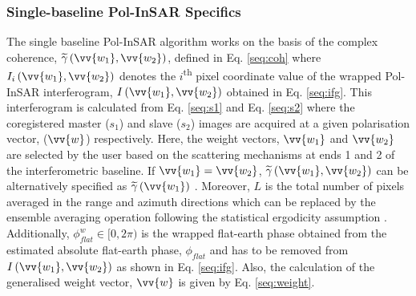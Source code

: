 \documentclass[review]{elsarticle}
\numberwithin{equation}{section}
\numberwithin{figure}{section}
\numberwithin{table}{section}
\begin{document}
\subsubsection{Single-baseline Pol-InSAR Specifics}

The single baseline Pol-InSAR algorithm works on the basis of the complex coherence, $\widetilde{\gamma}\left(\vv{w_1}, \vv{w_2}\right)$, defined in Eq. \eqref{seq:coh} where $I_i\left(\vv{w_1}, \vv{w_2}\right)$ denotes the $i$\textsuperscript{th} pixel coordinate value of the wrapped Pol-InSAR interferogram, $I\left(\vv{w_1}, \vv{w_2}\right)$ obtained in Eq. \eqref{seq:ifg}. This interferogram is calculated from Eq. \eqref{seq:s1} and Eq. \eqref{seq:s2} where the coregistered master ($s_1$) and slave ($s_2$) images are acquired at a given polarisation vector, ($\vv{w}$) respectively. Here, the weight vectors, $\vv{w_1}$ and $\vv{w_2}$ are selected by the user based on the scattering mechanisms at ends 1 and 2 of the interferometric baseline. If $\vv{w_1} = \vv{w_2}$, $\widetilde{\gamma}\left(\vv{w_1}, \vv{w_2}\right)$ can be alternatively specified as $\widetilde{\gamma}\left(\vv{w_1}\right)$ \citep{Cloude2005, Cloude2010}. Moreover, $L$ is the total number of pixels averaged in the range and azimuth directions which can be replaced by the ensemble averaging operation following the statistical ergodicity assumption \citep{Hanssen2001, Hoen2000, Kugler2015, Kumar2017, Papathanassiou2001}. Additionally, $\phi_{flat}^w \in [0, 2\pi)$ is the wrapped flat-earth phase obtained from the estimated absolute flat-earth phase, $\phi_{flat}$ and has to be removed from $I\left(\vv{w_1}, \vv{w_2}\right)$ as shown in Eq. \eqref{seq:ifg}. Also, the calculation of the generalised weight vector, $\vv{w}$ is given by Eq. \eqref{seq:weight}.
\end{document}

